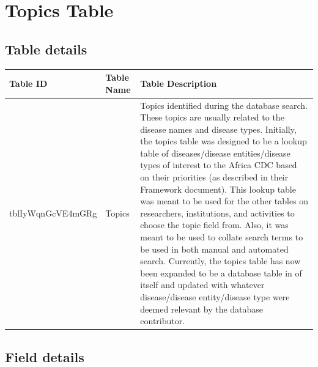 \documentclass[
]{book}
\begin{document}
\hypertarget{topics-table}{%
\section{Topics Table}\label{topics-table}}

\hypertarget{table-details-9}{%
\subsection{Table details}\label{table-details-9}}

\begin{table}
\centering
\begin{tabular}{l|l|l}
\hline
\textbf{Table ID} & \textbf{Table Name} & \textbf{Table Description}\\
\hline
tblIyWqnGcVE4mGRg & Topics & Topics identified during the database search. These  topics are usually related to the disease names and disease types. Initially, the topics table was designed to be a lookup table of diseases/disease entities/disease types of interest to the Africa CDC based on their priorities (as described in their Framework document).  This lookup table was meant to be used for the other tables on researchers, institutions, and activities to choose the topic field from. Also, it was meant to be used to collate search terms to be used in both manual and automated search. Currently, the topics table has now been expanded to be a database table in of itself and updated with whatever disease/disease entity/disease type were deemed relevant by the database contributor.\\
\hline
\end{tabular}
\end{table}

\hypertarget{field-details-6}{%
\subsection{Field details}\label{field-details-6}}
\end{document}
